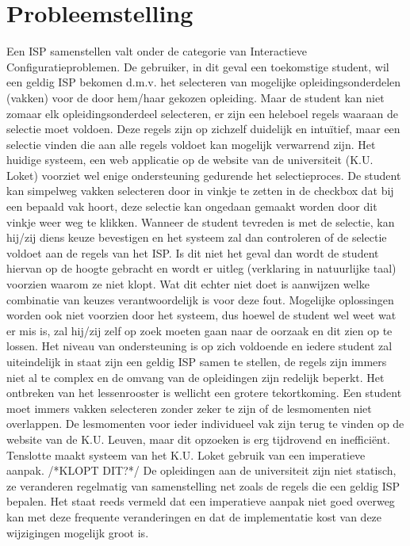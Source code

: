 \section{Probleemstelling}
Een ISP samenstellen valt onder de categorie van Interactieve Configuratieproblemen. De gebruiker, in dit geval een toekomstige student, wil een geldig ISP bekomen d.m.v. het selecteren van mogelijke opleidingsonderdelen (vakken) voor de door hem/haar gekozen opleiding. Maar de student kan niet zomaar elk opleidingsonderdeel selecteren, er zijn een heleboel regels waaraan de selectie moet voldoen. Deze regels zijn op zichzelf duidelijk en intu\"{i}tief, maar een selectie vinden die aan alle regels voldoet kan mogelijk verwarrend zijn. Het huidige systeem, een web applicatie op de website van de universiteit (K.U. Loket) voorziet wel enige ondersteuning gedurende het selectieproces. De student kan simpelweg vakken selecteren door in vinkje te zetten in de checkbox dat bij een bepaald vak hoort, deze selectie kan ongedaan gemaakt worden door dit vinkje weer weg te klikken. Wanneer de student tevreden is met de selectie, kan hij/zij diens keuze bevestigen en het systeem zal dan controleren of de selectie voldoet aan de regels van het ISP. Is dit niet het geval dan wordt de student hiervan op de hoogte gebracht en wordt er uitleg (verklaring in natuurlijke taal) voorzien waarom ze niet klopt. Wat dit echter niet doet is aanwijzen welke combinatie van keuzes verantwoordelijk is voor deze fout. Mogelijke oplossingen worden ook niet voorzien door het systeem, dus hoewel de student wel weet wat er mis is, zal hij/zij zelf op zoek moeten gaan naar  de oorzaak en dit zien op te lossen. Het niveau van ondersteuning is op zich voldoende en iedere student zal uiteindelijk in staat zijn een geldig ISP samen te stellen, de regels zijn immers niet al te complex en de omvang van de opleidingen zijn redelijk beperkt. Het ontbreken van het lessenrooster is wellicht een grotere tekortkoming. Een student moet immers vakken selecteren zonder zeker te zijn of de lesmomenten niet overlappen. De lesmomenten voor ieder individueel vak zijn terug te vinden op de website van de K.U. Leuven, maar dit opzoeken is erg tijdrovend en ineffici\"{e}nt. Tenslotte maakt systeem van het K.U. Loket  gebruik van een imperatieve aanpak. /*KLOPT DIT?*/ De opleidingen aan de universiteit zijn niet statisch, ze veranderen regelmatig van samenstelling net zoals de regels die een geldig ISP bepalen. Het staat reeds vermeld dat een imperatieve aanpak niet goed overweg kan met deze frequente veranderingen en dat de implementatie kost van deze wijzigingen mogelijk groot is. 

